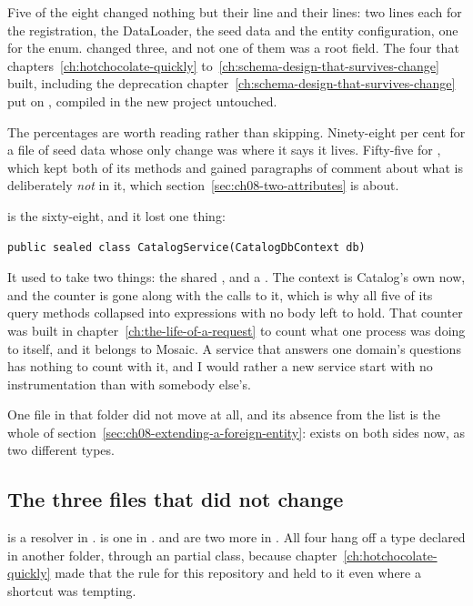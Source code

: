 Five of the eight changed nothing but their  line and their
 lines: two lines each for the registration, the DataLoader, the
seed data and the entity configuration, one for the enum.
 changed three, and not one of them was a root field. The
four that chapters~\ref{ch:hotchocolate-quickly}
to~\ref{ch:schema-design-that-survives-change} built, including the deprecation
chapter~\ref{ch:schema-design-that-survives-change} put on ,
compiled in the new project untouched.

The percentages are worth reading rather than skipping. Ninety-eight per cent
for a file of seed data whose only change was where it says it lives.
Fifty-five for , which kept both of its methods and gained
paragraphs of comment about what is deliberately \emph{not} in it, which
section~\ref{sec:ch08-two-attributes} is about.

 is the sixty-eight, and it lost one thing:

\begin{verbatim}
public sealed class CatalogService(CatalogDbContext db)
\end{verbatim}

%
It used to take two things: the shared , and a
. The context is Catalog's own now, and the counter is
gone along with the calls to it, which is why all five of its query methods
collapsed into expressions with no body left to hold. That counter was built in
chapter~\ref{ch:the-life-of-a-request} to count what one process was doing to
itself, and it belongs to Mosaic. A service that answers one domain's questions
has nothing to count with it, and I would rather a new service start with no
instrumentation than with somebody else's.

%
One file in that folder did not move at all, and its absence from the list is
the whole of section~\ref{sec:ch08-extending-a-foreign-entity}: 
exists on both sides now, as two different types.

\subsection*{The three files that did not change}

%
 is a resolver in .
 is one in .
 and  are two more in
. All four hang off a type declared in another folder,
through an  partial class, because
chapter~\ref{ch:hotchocolate-quickly} made that the rule for this repository and
held to it even where a shortcut was tempting.

